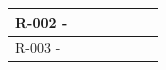 \begin{landscape}
\begin{table}[]
{\begin{tabular}{lllllll}
R-002 -                                                                     &                                                                                                                                                                                                                                                                &                                                                                                                                                                                                                                                                &                         &                                                                                                                                                                  &                                                                                                                                                 &                                                                                                                                        \\ \hline
R-003 -                                                                     &                                                                                                                                                                                                                                                                &                                                                                                                                                                                                                                                                &                         &                                                                                                                                                                  &                                                                                                                                                 &                                                                                                                                        \\ \hline

\end{tabular}}
\end{table}
\end{landscape}
